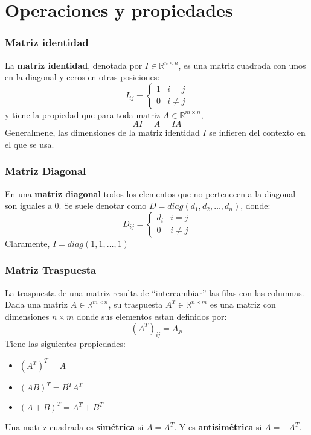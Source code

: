 \documentclass[10pt]{beamer}
\begin{document}
\section{Operaciones y propiedades}
\begin{frame}
    \frametitle{Matriz identidad}
    La \textbf{matriz identidad}, denotada por $I \in \mathbb{R}^{n\times n}$, es una matriz cuadrada
    con unos en la diagonal y ceros en otras posiciones:
    \begin{equation}
        I_{ij} = \begin{cases}
            1 & i = j\\
            0 & i \neq j
        \end{cases}
    \end{equation}
    y tiene la propiedad que para toda matriz $A \in \mathbb{R}^{m\times n}$,
    \begin{equation}
        AI = A = IA
    \end{equation}
    Generalmene, las dimensiones de la matriz identidad $I$ se infieren del contexto en el que se usa.
\end{frame}

\begin{frame}
    \frametitle{Matriz Diagonal}
    En una \textbf{matriz diagonal} todos los elementos que no pertenecen a la diagonal son iguales a 0. 
    Se suele denotar como $D = diag(d_1, d_2, \dots, d_n)$, donde:
    \begin{equation}
        D_{ij} = \begin{cases}
            d_i & i = j \\
            0 & i \neq j
        \end{cases}
    \end{equation}
    Claramente, $I = diag(1, 1, \dots, 1)$
\end{frame}

\begin{frame}
    \frametitle{Matriz Traspuesta}
    La traspuesta de una matriz resulta de ``intercambiar'' las filas con las columnas. Dada una matriz 
    $A \in \mathbb{R}^{m\times n}$, su traspuesta $A^T \in \mathbb{R}^{n\times m}$ es una matriz con dimensiones
    $n \times m$ donde sus elementos estan definidos por:
    \begin{equation}
        (A^T)_{ij} = A_{ji}
    \end{equation}
    Tiene las siguientes propiedades:
    \begin{itemize}
        \item $(A^T)^T = A$
        \item $(AB)^T = B^TA^T$
        \item $(A + B)^T = A^T + B^T$
    \end{itemize}
    Una matriz cuadrada es \textbf{simétrica} si $A = A^T$. Y es \textbf{antisimétrica} si $A = -A^T$.
\end{frame}
\end{document}
